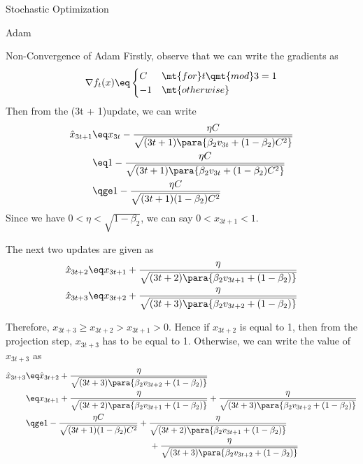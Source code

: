 \documentclass{article}
\begin{document}
\begin{psection}{Stochastic Optimization}
\begin{psubsection}{Adam}
\begin{pssubsection}{Non-Convergence of Adam}
			Firstly, observe that we can write the gradients as
			\begin{align*}
				\nabla f_t(x) \eq \begin{cases}
					C	& \mt{for} t \qmt{mod} 3 = 1 \\
					-1	& \mt{otherwise}
				\end{cases}
			\end{align*}
			Then from the (3t + 1)\tth update, we can write
			\begin{align*}
				\hat{x}_{3t + 1} &\eq	x_{3t} - \frac{\eta C}{\sqrt{(3t + 1) \para{\beta_2 v_{3t} + (1 - \beta_2) C^2}}} \\
				&\eq					1 - \frac{\eta C}{\sqrt{(3t + 1) \para{\beta_2 v_{3t} + (1 - \beta_2) C^2}}}  \\
				&\qge					1 - \frac{\eta C}{\sqrt{(3t + 1) (1 - \beta_2) C^2}}
			\end{align*}
			Since we have $0 < \eta < \sqrt{1 - \beta_2}$, we can say $0 < x_{3t + 1} < 1$.

			The next two updates are given as
			\begin{align*}
				\hat{x}_{3t + 2} &\eq	x_{3t + 1} + \frac{\eta}{\sqrt{(3t + 2) \para{\beta_2 v_{3t + 1} + (1 - \beta_2)}}} \\
				\hat{x}_{3t + 3} &\eq	x_{3t + 2} + \frac{\eta}{\sqrt{(3t + 3) \para{\beta_2 v_{3t + 2} + (1 - \beta_2)}}}
			\end{align*}

			Therefore, $x_{3t + 3} \ge x_{3t + 2} > x_{3t + 1} > 0$. Hence if $x_{3t + 2}$ is equal to 1, then from the projection step, $x_{3t + 3}$ has to be equal to 1. Otherwise, we can write the value of $\hat{x}_{3t + 3}$ as
			\begin{align*}
				\hat{x}_{3t + 3} &\eq	\hat{x}_{3t + 2} + \frac{\eta}{\sqrt{(3t + 3) \para{\beta_2 v_{3t + 2} + (1 - \beta_2)}}} \\
				&\eq					x_{3t + 1} + \frac{\eta}{\sqrt{(3t + 2) \para{\beta_2 v_{3t + 1} + (1 - \beta_2)}}} + \frac{\eta}{\sqrt{(3t + 3) \para{\beta_2 v_{3t + 2} + (1 - \beta_2)}}} \\
				&\qge					1 - \frac{\eta C}{\sqrt{(3t + 1) (1 - \beta_2) C^2}} + \frac{\eta}{\sqrt{(3t + 2) \para{\beta_2 v_{3t + 1} + (1 - \beta_2)}}} \\
				&\hspace{5.1cm}+ \frac{\eta}{\sqrt{(3t + 3) \para{\beta_2 v_{3t + 2} + (1 - \beta_2)}}}
			\end{align*}


\end{pssubsection}
\end{psubsection}
\end{psection}
\end{document}
